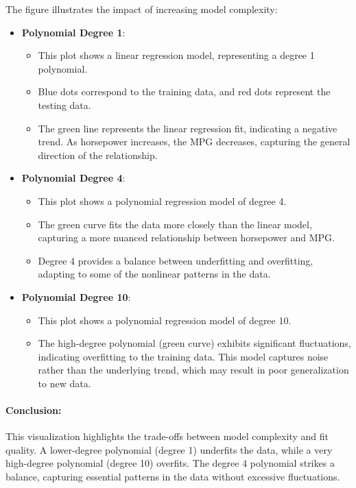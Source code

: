 \documentclass{article}
\begin{document}
	The figure illustrates the impact of increasing model complexity:
	
	\begin{itemize}
		\item \textbf{Polynomial Degree 1}: 
		\begin{itemize}
			\item This plot shows a linear regression model, representing a degree 1 polynomial.
			\item Blue dots correspond to the training data, and red dots represent the testing data.
			\item The green line represents the linear regression fit, indicating a negative trend. As horsepower increases, the MPG decreases, capturing the general direction of the relationship.
		\end{itemize}
		
		\item \textbf{Polynomial Degree 4}: 
		\begin{itemize}
			\item This plot shows a polynomial regression model of degree 4.
			\item The green curve fits the data more closely than the linear model, capturing a more nuanced relationship between horsepower and MPG.
			\item Degree 4 provides a balance between underfitting and overfitting, adapting to some of the nonlinear patterns in the data.
		\end{itemize}
		
		\item \textbf{Polynomial Degree 10}: 
		\begin{itemize}
			\item This plot shows a polynomial regression model of degree 10.
			\item The high-degree polynomial (green curve) exhibits significant fluctuations, indicating overfitting to the training data. This model captures noise rather than the underlying trend, which may result in poor generalization to new data.
		\end{itemize}
	\end{itemize}
	
	\paragraph{Conclusion:} This visualization highlights the trade-offs between model complexity and fit quality. A lower-degree polynomial (degree 1) underfits the data, while a very high-degree polynomial (degree 10) overfits. The degree 4 polynomial strikes a balance, capturing essential patterns in the data without excessive fluctuations.
	
\end{document}
